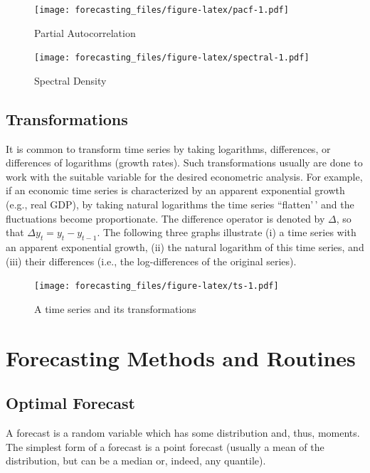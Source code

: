 \documentclass[
  12pt,
  oneside]{book}
\begin{document}
\begin{figure}
\centering
\texttt{[image: forecasting\_files/figure-latex/pacf-1.pdf]}
\caption{\label{fig:pacf}Partial Autocorrelation}
\end{figure}

\begin{figure}
\centering
\texttt{[image: forecasting\_files/figure-latex/spectral-1.pdf]}
\caption{\label{fig:spectral}Spectral Density}
\end{figure}

\hypertarget{transformations}{%
\section{Transformations}\label{transformations}}

It is common to transform time series by taking logarithms, differences, or differences of logarithms (growth rates). Such transformations usually are done to work with the suitable variable for the desired econometric analysis. For example, if an economic time series is characterized by an apparent exponential growth (e.g., real GDP), by taking natural logarithms the time series ``flatten'\,' and the fluctuations become proportionate. The difference operator is denoted by \(\Delta\), so that \(\Delta y_t = y_t-y_{t-1}\). The following three graphs illustrate (i) a time series with an apparent exponential growth, (ii) the natural logarithm of this time series, and (iii) their differences (i.e., the log-differences of the original series).

\begin{figure}
\centering
\texttt{[image: forecasting\_files/figure-latex/ts-1.pdf]}
\caption{\label{fig:ts}A time series and its transformations}
\end{figure}

\hypertarget{forecasting-methods-and-routines}{%
\chapter{Forecasting Methods and Routines}\label{forecasting-methods-and-routines}}

\hypertarget{optimal-forecast}{%
\section{Optimal Forecast}\label{optimal-forecast}}

A forecast is a random variable which has some distribution and, thus, moments. The simplest form of a forecast is a point forecast (usually a mean of the distribution, but can be a median or, indeed, any quantile).
\end{document}
